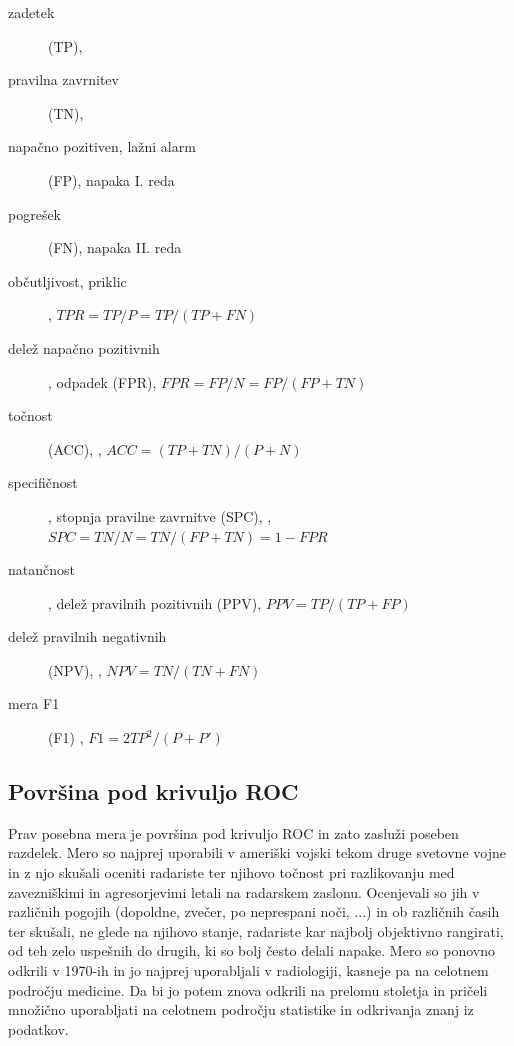 \begin{description}
\item[zadetek] (TP), 
\item[pravilna zavrnitev](TN), 
\item[napačno pozitiven, lažni alarm] (FP), napaka I. reda 
\item[pogrešek] (FN), napaka II. reda 
\item[občutljivost, priklic] , $TPR = {TP / P} = {TP / (TP+FN)} $
\item[delež napačno pozitivnih], odpadek (FPR),  $FPR = FP / N = FP / (FP + TN)$
\item[točnost] (ACC), , $ACC = (TP + TN) / (P + N)$
\item[specifičnost], stopnja pravilne zavrnitve (SPC), , $SPC = TN / N = TN / (FP + TN) = 1 - FPR$
\item[natančnost], delež pravilnih pozitivnih (PPV),  $PPV = TP / (TP + FP)$
\item[delež pravilnih negativnih] (NPV), , $NPV = TN / (TN + FN)$
\item[mera F1] (F1) , $F1 = 2TP^2/(P+P')$
\end{description}

\subsection{Površina pod krivuljo ROC}

Prav posebna mera je površina pod krivuljo ROC  in zato zasluži poseben razdelek. Mero so najprej uporabili v ameriški vojski tekom druge svetovne vojne in z njo skušali oceniti radariste ter njihovo točnost pri razlikovanju med zavezniškimi in agresorjevimi letali na radarskem zaslonu. Ocenjevali so jih v različnih pogojih (dopoldne, zvečer, po neprespani noči, ...) in ob različnih časih ter skušali, ne glede na njihovo stanje, radariste kar najbolj objektivno rangirati, od teh zelo uspešnih do drugih, ki so bolj često delali napake. Mero so ponovno odkrili v 1970-ih in jo najprej uporabljali v radiologiji, kasneje pa na celotnem področju medicine. Da bi jo potem znova odkrili na prelomu stoletja in pričeli množično uporabljati na celotnem področju statistike in odkrivanja znanj iz podatkov.

